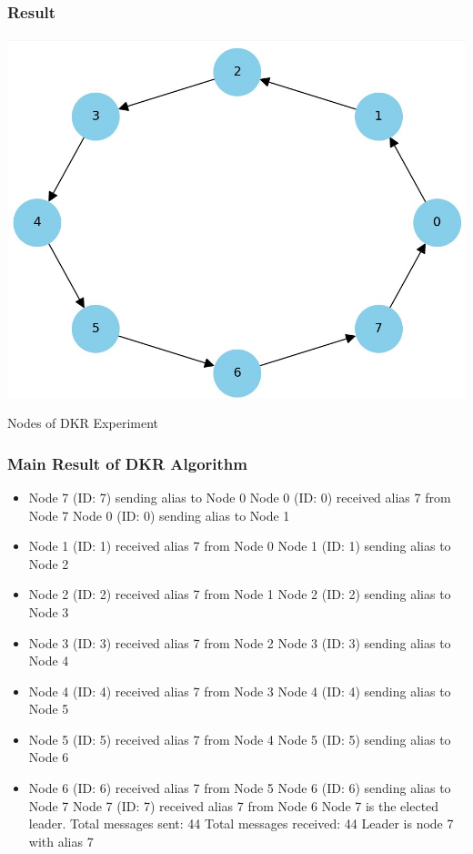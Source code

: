 \documentclass[11pt]{beamer}              %
\begin{document}
\begin{frame}
\frametitle{Result}
\framesubtitle{}

    \centering
    \includegraphics[scale=0.6]{figures/Screen20.jpg}
    \caption{Nodes of DKR Experiment}
    \label{fig:Message Complexity}

\end{frame}



\begin{frame}
\frametitle{Main Result of DKR Algorithm}
\begin{itemize}
\item Node 7 (ID: 7) sending alias to Node 0
 Node 0 (ID: 0) received alias 7 from Node 7
Node 0 (ID: 0) sending alias to Node 1
\item Node 1 (ID: 1) received alias 7 from Node 0
Node 1 (ID: 1) sending alias to Node 2
\item Node 2 (ID: 2) received alias 7 from Node 1
Node 2 (ID: 2) sending alias to Node 3
\item Node 3 (ID: 3) received alias 7 from Node 2
Node 3 (ID: 3) sending alias to Node 4
\item Node 4 (ID: 4) received alias 7 from Node 3
Node 4 (ID: 4) sending alias to Node 5
\item Node 5 (ID: 5) received alias 7 from Node 4
Node 5 (ID: 5) sending alias to Node 6
\item Node 6 (ID: 6) received alias 7 from Node 5
Node 6 (ID: 6) sending alias to Node 7
Node 7 (ID: 7) received alias 7 from Node 6
Node 7 is the elected leader.
Total messages sent: 44
Total messages received: 44
Leader is node 7 with alias 7
\end{itemize}
\end{frame}
\end{document}
